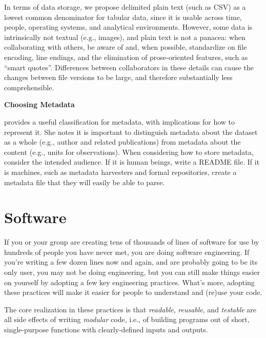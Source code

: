 \documentclass[10pt]{article}
\begin{document}
In terms of data storage, we propose delimited plain text (such as
CSV) as a lowest common denominator for tabular data, since it is
usable across time, people, operating systems, and analytical
environments.  However, some data is intrinsically not textual (e.g.,
images), and plain text is not a panacea: when collaborating with
others, be aware of and, when possible, standardize on file encoding,
line endings, and the elimination of prose-oriented features, such as
``smart quotes''. Differences between collaborators in these details
can cause the changes between file versions to be large, and therefore
substantially less comprehensible.

\begin{framed}
  \noindent \textbf{Choosing Metadata}

  \cite{wickes2015} provides a useful classification for metadata,
  with implications for how to represent it. She notes it is important
  to distinguish metadata about the dataset as a whole (e.g., author
  and related publications) from metadata about the content (e.g.,
  units for observations).  When considering how to store metadata,
  consider the intended audience. If it is human beings, write a
  README file. If it is machines, such as metadata harvesters and
  formal repositories, create a metadata file that they will easily be
  able to parse.
\end{framed}

\section{Software}\label{sec:software}

If you or your group are creating tens of thousands of lines of
software for use by hundreds of people you have never met, you are
doing software engineering. If you're writing a few dozen lines now
and again, and are probably going to be its only user, you may not be
doing engineering, but you can still make things easier on yourself by
adopting a few key engineering practices. What's more, adopting these
practices will make it easier for people to understand and (re)use
your code.

The core realization in these practices is that \emph{readable},
\emph{reusable}, and \emph{testable} are all side effects of writing
\emph{modular} code, i.e., of building programs out of short,
single-purpose functions with clearly-defined inputs and outputs.
\end{document}

